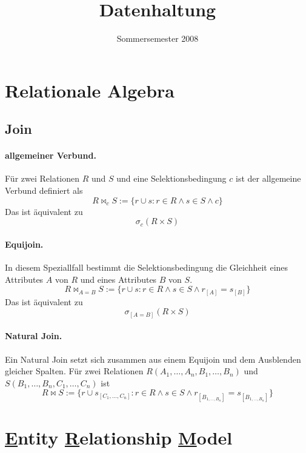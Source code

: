 \documentclass[]{scrartcl}
\begin{document}
\title{Datenhaltung}
\date{Sommersemester 2008}

\author{}



\maketitle
\tableofcontents

\section{Relationale Algebra}

\subsection{Join}

\paragraph{allgemeiner Verbund.} F\"ur zwei Relationen $R$ und $S$ und eine Selektionsbedingung $c$ ist der allgemeine Verbund definiert als
$$ R \bowtie_{c} S := \{ r \cup s : r \in R \wedge s \in S \wedge c \} $$
Das ist \"aquivalent zu 
$$ \sigma_{c} (R \times S)$$

\paragraph{Equijoin. } In diesem Speziallfall bestimmt die Selektionsbedingung die Gleichheit eines Attributes $A$ von $R$ und eines Attributes $B$ von $S$.
$$R \bowtie_{A = B} S := \{ r \cup s : r \in R \wedge s \in S \wedge r_{[A]} = s_{[B]} \}$$
Das ist \"aquivalent zu 
$$ \sigma_{[A = B]} (R \times S)$$

\paragraph{Natural Join.} Ein Natural Join setzt sich zusammen aus einem Equijoin und dem Ausblenden gleicher Spalten. F\"ur zwei Relationen $R(A_{1},\dots, A_{n},B_{1},\dots,B_{n})$ und $S(B_{1},\dots,B_{n},C_{1},\dots,C_{n})$ ist
$$R \bowtie S := \{ r \cup s_{[C_{1}, \dots, C_{n}]} : r \in R \wedge s \in S \wedge r_{[B_{1, \dots, B_{n}}]} = s_{[B_{1, \dots, B_{n}}]} \}$$



\section{\underline{E}ntity \underline{R}elationship \underline{M}odel }
\end{document}
